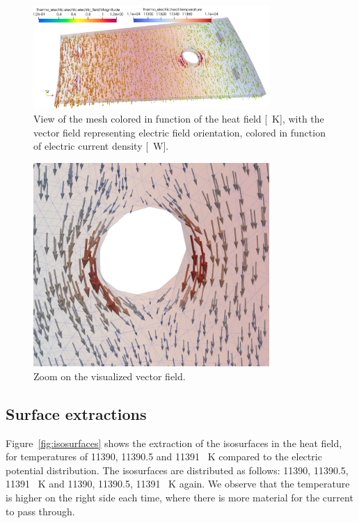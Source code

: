 \documentclass[12pt]{article}
\begin{document}
\begin{figure}[H]
  \centering
  \includegraphics[width=0.8\textwidth]{images/glyph2.png}
  \caption{View of the mesh colored in function of the heat field [\SI{}{\kelvin}],
    with the vector field representing electric field orientation, colored in function
  of electric current density [\SI{}{\watt}].}
  \label{fig:glyph}
\end{figure}

\begin{figure}[H]
  \centering
  \includegraphics[width=0.8\textwidth]{images/field1_zoom.png}
  \caption{Zoom on the visualized vector field.}
  \label{fig:field1_zoom}
\end{figure}

\subsection{Surface extractions}
Figure~\ref{fig:isosurfaces} shows the extraction of the isosurfaces in the heat field,
for temperatures of 11390, 11390.5 and 11391 \SI{}{\kelvin} compared to the
electric potential distribution. The isosurfaces are distributed as follows: 11390, 11390.5, 11391 \SI{}{\kelvin} and
11390, 11390.5, 11391 \SI{}{\kelvin} again. We observe that the temperature is higher on the right
side each time, where there is more material for the current to pass through.
\end{document}
